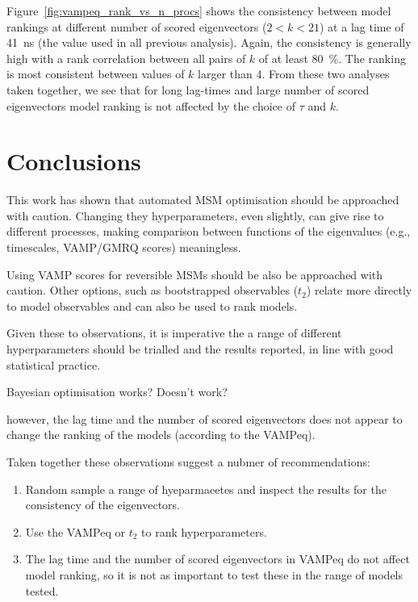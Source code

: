 \documentclass[journal=jacsat,manuscript=article]{achemso}
\begin{document}
Figure~\ref{fig:vampeq_rank_vs_n_procs} shows the consistency between model rankings at different number of scored eigenvectors ($2 < k < 21$) at a lag time of \SI{41}{\nano\second} (the value used in all previous analysis). Again, the consistency is generally high with a rank correlation between all pairs of $k$ of at least \SI{80}{\percent}. The ranking is most consistent between values of $k$ larger than \num{4}.  From these two analyses taken together, we see that for long lag-times and large number of scored eigenvectors model ranking is not affected by the choice of $\tau$ and $k$.

\section{Conclusions}

This work has shown that automated MSM optimisation should be approached with caution.  Changing they hyperparameters, even slightly, can give rise to different processes, making comparison between functions of the eigenvalues (e.g., timescales, VAMP/GMRQ scores) meaningless.  

Using VAMP scores for reversible MSMs should be also be approached with caution.  Other options, such as bootstrapped observables ($t_2$) relate more directly to model observables and can also be used to rank models.  

Given these to observations, it is imperative the a range of different hyperparameters should be trialled and the results reported, in line with good statistical practice.  

Bayesian optimisation  works? Doesn't work? 

however, the lag time and the number of scored eigenvectors does not appear to change the ranking of the models (according to the VAMPeq).  

Taken together these observations suggest a nubmer of recommendations: 

\begin{enumerate}
    \item Random sample a range of hyeparmaeetes and inspect the results for the consistency of the eigenvectors.  
    \item Use the VAMPeq or $t_2$ to rank hyperparameters. 
    \item The lag time and the number of scored eigenvectors in VAMPeq do not affect model ranking, so it is not as important to test these in the range of models tested. 
\end{enumerate}
\end{document}
